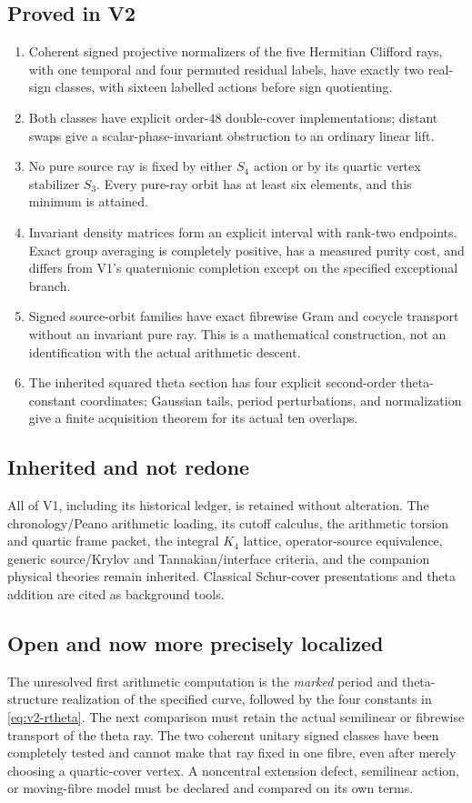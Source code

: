 \documentclass[11pt]{article}
\theoremstyle{definition}
\theoremstyle{remark}
\begin{document}
\subsection{Proved in V2}
\begin{enumerate}[label=\textup{(P2.\arabic*)},leftmargin=3.6em]
\item Coherent signed projective normalizers of the five Hermitian Clifford
rays, with one temporal and four permuted residual labels, have exactly two
real-sign classes, with sixteen labelled actions before sign quotienting.
\item Both classes have explicit order-$48$ double-cover implementations;
distant swaps give a scalar-phase-invariant obstruction to an ordinary
linear lift.
\item No pure source ray is fixed by either $S_4$ action or by its quartic
vertex stabilizer $S_3$. Every pure-ray orbit has at least six elements,
and this minimum is attained.
\item Invariant density matrices form an explicit interval with rank-two
endpoints. Exact group averaging is completely positive, has a measured
purity cost, and differs from V1's quaternionic completion except on the
specified exceptional branch.
\item Signed source-orbit families have exact fibrewise Gram and cocycle
transport without an invariant pure ray. This is a mathematical
construction, not an identification with the actual arithmetic descent.
\item The inherited squared theta section has four explicit second-order
theta-constant coordinates; Gaussian tails, period perturbations, and
normalization give a finite acquisition theorem for its actual ten overlaps.
\end{enumerate}

\subsection{Inherited and not redone}
All of V1, including its historical ledger, is retained without alteration.
The chronology/Peano arithmetic loading, its cutoff calculus, the
arithmetic torsion and quartic frame packet, the integral $K_4$ lattice,
operator-source equivalence, generic source/Krylov and Tannakian/interface
criteria, and the companion physical theories remain inherited. Classical
Schur-cover presentations and theta addition are cited as background tools.

\subsection{Open and now more precisely localized}
The unresolved first arithmetic computation is the \emph{marked} period and
theta-structure realization of the specified curve, followed by the four
constants in \eqref{eq:v2-rtheta}. The next comparison must retain the
actual semilinear or fibrewise transport of the theta ray. The two coherent
unitary signed classes have been completely tested and cannot make that ray
fixed in one fibre, even after merely choosing a quartic-cover vertex.
A noncentral extension defect, semilinear action, or moving-fibre model must
be declared and compared on its own terms.
\end{document}
